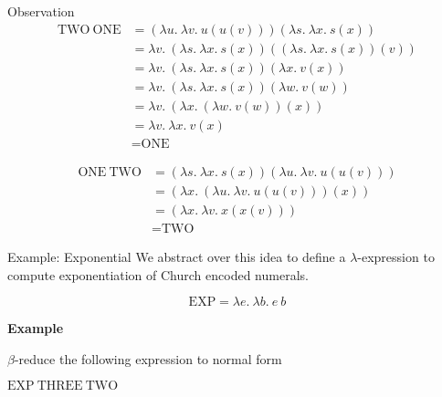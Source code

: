 \documentclass{beamer}
\begin{document}
\begin{frame}{Observation}
	\begin{align*}
        \text{TWO} \ \text{ONE} &= (\lambda u. \ \lambda v. \ u(u(v))) (\lambda s. \ \lambda x. \ s(x)) \\
        &= \lambda v. \ (\lambda s. \ \lambda x. \ s(x))((\lambda s. \ \lambda x. \ s(x))(v)) \\
        &= \lambda v. \ (\lambda s. \ \lambda x. \ s(x))(\lambda x. \ v(x)) \\
        &= \lambda v. \ (\lambda s. \ \lambda x. \ s(x))(\lambda w. \ v(w)) \\
        &= \lambda v. \ (\lambda x. \ (\lambda w. \ v(w))(x)) \\
        &= \lambda v. \ \lambda x. \ v(x) \\
        &= \text{ONE}
    \end{align*}
    
    \begin{align*}
        \text{ONE} \ \text{TWO} &= (\lambda s. \ \lambda x. \ s(x))(\lambda u. \ \lambda v. \ u(u(v))) \\
        &= (\lambda x. \ (\lambda u. \ \lambda v. \ u(u(v)))(x)) \\
        &= (\lambda x. \ \lambda v. \ x(x(v))) \\
        &= \text{TWO}
    \end{align*}
\end{frame}

\begin{frame}{Example: Exponential}
    We abstract over this idea to define a $\lambda$-expression to compute exponentiation of Church encoded numerals.
    
    $$\text{EXP} = \lambda e. \ \lambda b. \ e \ b $$
    
    {\bf Example} 
    
    $\beta$-reduce the following expression to normal form
    
    \vspace{0.3cm}
    
    $\text{EXP} \ \text{THREE} \ \text{TWO}$
    \vspace{3cm}
\end{frame}
\end{document}
